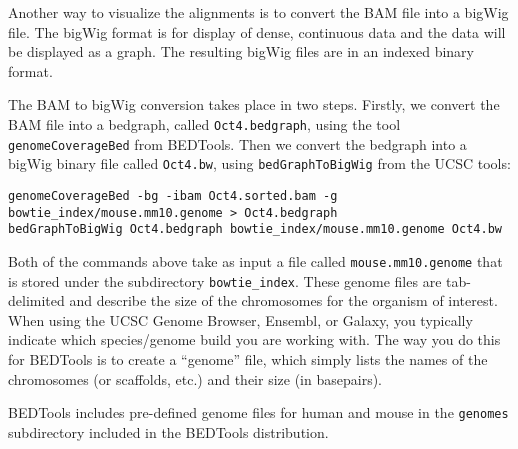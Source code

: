\begin{note}
Another way to visualize the alignments is to convert the BAM file into a bigWig
file. The bigWig format is for display of dense, continuous data and the data
will be displayed as a graph. The resulting bigWig files are in an indexed
binary format.
\end{note}

\begin{steps}
The BAM to bigWig conversion takes place in two steps. Firstly, we convert the
BAM file into a bedgraph, called \texttt{Oct4.bedgraph}, using the tool
\texttt{genomeCoverageBed} from BEDTools. Then we convert the bedgraph into a
bigWig binary file called \texttt{Oct4.bw}, using \texttt{bedGraphToBigWig} from
the UCSC tools:

\begin{lstlisting}
genomeCoverageBed -bg -ibam Oct4.sorted.bam -g bowtie_index/mouse.mm10.genome > Oct4.bedgraph 
bedGraphToBigWig Oct4.bedgraph bowtie_index/mouse.mm10.genome Oct4.bw
\end{lstlisting}
\end{steps}

\begin{note}
Both of the commands above take as input a file called
\texttt{mouse.mm10.genome} that is stored under the subdirectory \texttt{bowtie\_index}. These genome files are
tab-delimited and describe the size of the chromosomes for the organism of
interest. When using the UCSC Genome Browser, Ensembl, or Galaxy, you typically
indicate which species/genome build you are working with. The way you do this for
BEDTools is to create a ``genome'' file, which simply lists the names of
the chromosomes (or scaffolds, etc.) and their size (in basepairs).

BEDTools includes pre-defined genome files for human and mouse in the
\texttt{genomes} subdirectory included in the BEDTools distribution.
\end{note}

